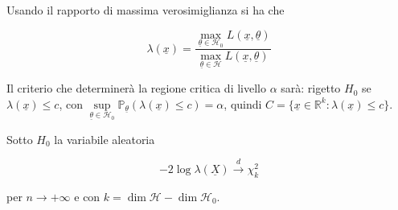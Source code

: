 \documentclass[hidelinks, 10pt]{report}
\begin{document}
Usando il rapporto di massima verosimiglianza si ha che

\[ \lambda(\underline{x}) = \frac{\max\limits_{\underline{\theta} \in \mathcal{H}_{0}} L(\underline{x}, \underline{\theta})}{\max\limits_{\underline{\theta} \in \mathcal{H}} L(\underline{x}, \underline{\theta})} \]

Il criterio che determiner\`a la regione critica di livello $ \alpha $ sar\`a: rigetto $ H_{0} $ se $ \lambda(\underline{x}) \le c $, con $ \sup\limits_{\underline{\theta} \in \mathcal{H}_{0}} \mathbb{P}_{\underline{\theta}} \left( \lambda(\underline{x}) \le c \right) = \alpha $, quindi $ C = \{ \underline{x} \in \mathbb{R}^{k} : \lambda (\underline{x}) \le c \} $.

\begin{thm}
Sotto $ H_{0} $ la variabile aleatoria

\[ -2 \log \lambda (\underline{X}) \stackrel{d}{\to} \chi^{2}_{k} \]

per $ n \to +\infty $ e con $ k = \dim \mathcal{H} - \dim \mathcal{H}_{0} $.
\end{thm}
\end{document}
